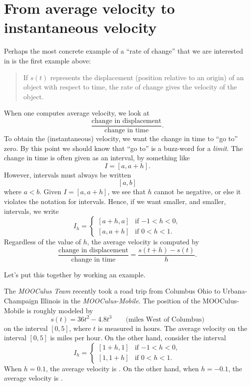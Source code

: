 \documentclass{ximera}
\begin{document}
\section{From average velocity to instantaneous velocity}


Perhaps the most concrete example of a ``rate of change'' that we are
interested in is the first example above:
\begin{quote}
  If $s(t)$ represents the displacement (position relative to an origin)
  of an object with respect to time, the rate of change gives the
  velocity of the object.
\end{quote}
When one computes average velocity, we look at 
\[
\frac{\text{change in displacement}}{\text{change in time}}.
\]
To obtain the (instantaneous) velocity, we want the change in time to
``go to'' zero. By this point we should know that ``go to'' is a
buzz-word for a \textit{limit}. The change in time is often given as
an interval, by something like
\[
I = [a, a+h].
\]
However, intervals must always be written 
\[
[a,b]
\]
where $a < b$. Given $I = [a, a+h]$, we see that $h$ cannot be
negative, or else it violates the notation for intervals. Hence, if we
want smaller, and smaller, intervals, we write
\[
I_h = 
\begin{cases}
  [a+h,a]  & \text{if $-1<h<0$}, \\ %
  [a,a+h]  & \text{if $0<h<1$}.     %
\end{cases}
\]
Regardless of the value of $h$, the average velocity is computed by
\[
\frac{\text{change in displacement}}{\text{change in time}} =
\frac{s(t+h)-s(t)}{h}.
\]

Let's put this together by working an example.

\begin{example}
The \textit{MOOCulus Team} recently took a road trip from Columbus
Ohio to Urbana-Champaign Illinois in the \textit{MOOCulus-Mobile}. The
position of the MOOCulus-Mobile is roughly modeled by
\[
s(t) = 36t^2 - 4.8t^3 \qquad\text{(miles West of Columbus)} %
\]
on the interval $[0,5]$, where $t$ is measured in hours. The average
velocity on the interval $[0,5]$ is  miles per hour. On the
other hand, consider the interval
\[
I_h = 
\begin{cases}
  [1+h,1]  & \text{if $-1<h<0$}, \\ %
  [1,1+h]  & \text{if $0<h<1$}.     %
\end{cases}
\]
When $h = 0.1$, the average velocity is . On the other
hand, when $h=-0.1$, the average velocity is .
\end{example}
\end{document}

